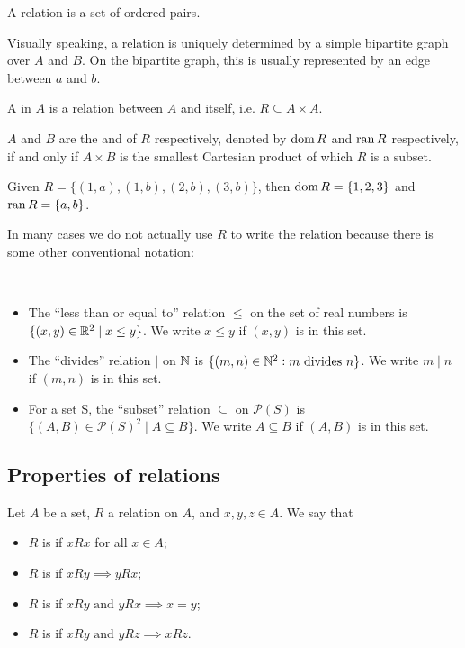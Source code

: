 \begin{remark}
A relation is a set of ordered pairs.
\end{remark}

Visually speaking, a relation is uniquely determined by a simple bipartite graph over $A$ and $B$. On the bipartite graph, this is usually represented by an edge between $a$ and $b$.

\begin{definition}
A  in $A$ is a relation between $A$ and itself, i.e. $R \subseteq A \times A$.
\end{definition}

$A$ and $B$ are the  and  of $R$ respectively, denoted by $\operatorname{dom} R$ and $\operatorname{ran} R$ respectively, if and only if $A \times B$ is the smallest Cartesian product of which $R$ is a subset.

\begin{example}
Given $R=\{(1,a),(1,b),(2,b),(3,b)\}$, then $\operatorname{dom} R=\{1,2,3\}$ and $\operatorname{ran} R=\{a,b\}$.
\end{example}

In many cases we do not actually use $R$ to write the relation because there is some other conventional notation:

\begin{example} \
\begin{itemize}
\item The ``less than or equal to'' relation $\le$ on the set of real numbers is $\{(x,y) \in \mathbb R^2 \mid x \le y\}$. We write $x \le y$ if $(x,y)$ is in this set.
\item The ``divides'' relation $\mid$ on $\mathbb N$ is $\{(m,n) \in \mathbb N^2: m \text{ divides } n\}$. We write $m \mid n$ if $(m,n)$ is in this set.
\item For a set S, the ``subset'' relation $\subseteq$ on $\mathcal{P}(S)$ is $\{(A,B) \in \mathcal{P}(S)^2 \mid A \subseteq B\}$. We write $A \subseteq B$ if $(A,B)$ is in this set.
\end{itemize}
\end{example}
\pagebreak

\subsection{Properties of relations}
Let $A$ be a set, $R$ a relation on $A$, and $x,y,z \in A$. We say that
\begin{itemize}
\item $R$ is  if $xRx$ for all $x\in A$;
\item $R$ is  if $xRy \implies yRx$;
\item $R$ is  if $xRy \text{ and } yRx \implies x=y$;
\item $R$ is \vocab{transitive} if $xRy \text{ and } yRz \implies xRz$.
\end{itemize}

